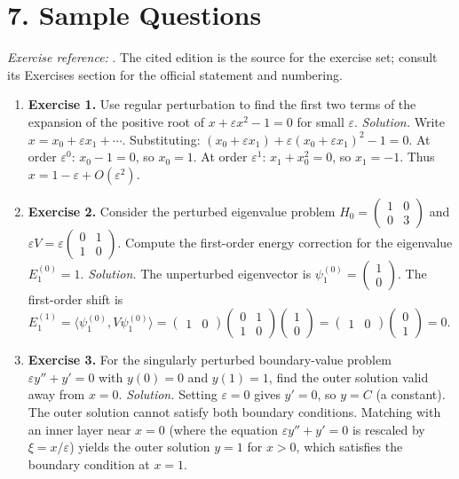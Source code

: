 \section*{7. Sample Questions}
\emph{Exercise reference:} \cite{perturbation_ref1}. The cited edition is the source for the exercise set; consult its Exercises section for the official statement and numbering.
\begin{enumerate}[leftmargin=*,itemsep=0.9em]
\item \textbf{Exercise 1.} Use regular perturbation to find the first two terms of the expansion of the positive root of $x+\varepsilon x^2-1=0$ for small $\varepsilon$. \emph{Solution.} Write $x=x_0+\varepsilon x_1+\cdots$. Substituting: $(x_0+\varepsilon x_1)+\varepsilon(x_0+\varepsilon x_1)^2-1=0$. At order $\varepsilon^0$: $x_0-1=0$, so $x_0=1$. At order $\varepsilon^1$: $x_1+x_0^2=0$, so $x_1=-1$. Thus $x=1-\varepsilon+O(\varepsilon^2)$.

\item \textbf{Exercise 2.} Consider the perturbed eigenvalue problem $H_0=\begin{pmatrix}1&0\\0&3\end{pmatrix}$ and $\varepsilon V=\varepsilon\begin{pmatrix}0&1\\1&0\end{pmatrix}$. Compute the first-order energy correction for the eigenvalue $E_1^{(0)}=1$. \emph{Solution.} The unperturbed eigenvector is $\psi_1^{(0)}=\begin{pmatrix}1\\0\end{pmatrix}$. The first-order shift is $E_1^{(1)}=\langle\psi_1^{(0)},V\psi_1^{(0)}\rangle=\begin{pmatrix}1&0\end{pmatrix}\begin{pmatrix}0&1\\1&0\end{pmatrix}\begin{pmatrix}1\\0\end{pmatrix}=\begin{pmatrix}1&0\end{pmatrix}\begin{pmatrix}0\\1\end{pmatrix}=0$.

\item \textbf{Exercise 3.} For the singularly perturbed boundary-value problem $\varepsilon y''+y'=0$ with $y(0)=0$ and $y(1)=1$, find the outer solution valid away from $x=0$. \emph{Solution.} Setting $\varepsilon=0$ gives $y'=0$, so $y=C$ (a constant). The outer solution cannot satisfy both boundary conditions. Matching with an inner layer near $x=0$ (where the equation $\varepsilon y''+y'=0$ is rescaled by $\xi=x/\varepsilon$) yields the outer solution $y=1$ for $x>0$, which satisfies the boundary condition at $x=1$.


\end{enumerate}
